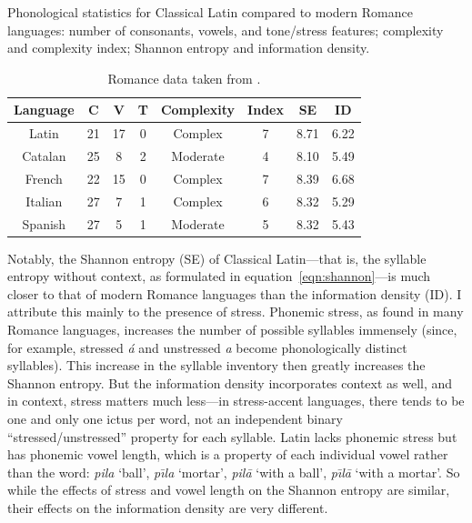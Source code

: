 \documentclass[12pt,twoside,leqno]{article} %
\begin{document}
\begin{table}[h]
\centering
\caption{Phonological statistics for Classical Latin compared to modern Romance languages: number of consonants, vowels, and tone/stress features; complexity and complexity index; Shannon entropy and information density. }
\label{tab:phono}

\vspace{2ex}

\begin{tabular}{|c|c|c|c|c|c|c|c|}
\hline
\textbf{Language} & \textbf{C} & \textbf{V} & \textbf{T} & \textbf{Complexity} & \textbf{Index} & \textbf{SE} & \textbf{ID} \\\hline
Latin & 21 & 17 & 0 & Complex & 7 & 8.71 & 6.22 \\\hline
Catalan & 25 & 8 & 2 & Moderate & 4 & 8.10 & 5.49 \\\hline
French & 22 & 15 & 0 & Complex & 7 & 8.39 & 6.68 \\\hline
Italian & 27 & 7 & 1 & Complex & 6 & 8.32 & 5.29 \\\hline
Spanish & 27 & 5 & 1 & Moderate & 5 & 8.32 & 5.43 \\\hline
\end{tabular}

\vspace{2ex}

\caption*{Romance data taken from \citet[44-45]{oh}.}
\end{table}

Notably, the Shannon entropy (SE) of Classical Latin---that is, the syllable entropy without context, as formulated in equation~\ref{eqn:shannon}---is much closer to that of modern Romance languages than the information density (ID). I attribute this mainly to the presence of stress. Phonemic stress, as found in many Romance languages, increases the number of possible syllables immensely (since, for example, stressed \emph{\'a} and unstressed \emph{a} become phonologically distinct syllables). This increase in the syllable inventory then greatly increases the Shannon entropy. But the information density incorporates context as well, and in context, stress matters much less---in stress-accent languages, there tends to be one and only one ictus per word, not an independent binary ``stressed/unstressed'' property for each syllable. Latin lacks phonemic stress but has phonemic vowel length, which is a property of each individual vowel rather than the word: \emph{pila} `ball', \emph{p\=\i{}la} `mortar', \emph{pil\=a} `with a ball', \emph{p\=\i{}l\=a} `with a mortar'. So while the effects of stress and vowel length on the Shannon entropy are similar, their effects on the information density are very different.
\end{document}
